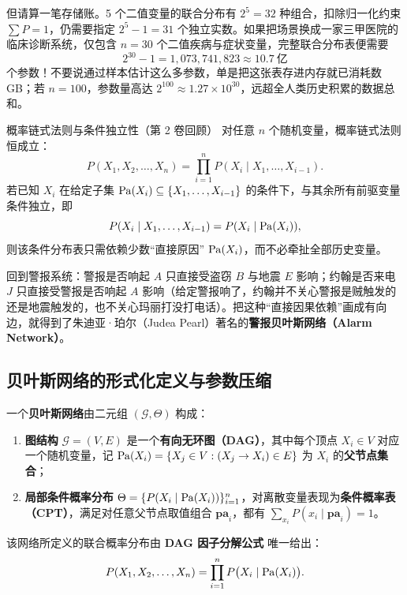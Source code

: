 但请算一笔存储账。5 个二值变量的联合分布有 $2^5 = 32$ 种组合，扣除归一化约束 $\sum P = 1$，仍需要指定 $2^5 - 1 = 31$ 个独立实数。如果把场景换成一家三甲医院的临床诊断系统，仅包含 $n = 30$ 个二值疾病与症状变量，完整联合分布表便需要
\[
  2^{30} - 1 = 1{,}073{,}741{,}823 \approx 10.7\ \text{亿}
\]
个参数！不要说通过样本估计这么多参数，单是把这张表存进内存就已消耗数 GB；若 $n = 100$，参数量高达 $2^{100} \approx 1.27 \times 10^{30}$，远超全人类历史积累的数据总和。

\begin{recallBox}{概率链式法则与条件独立性（第 2 卷回顾）}
对任意 $n$ 个随机变量，概率链式法则恒成立：
\[
  P(X_1, X_2, \dots, X_n) = \prod_{i=1}^{n} P(X_i \mid X_1, \dots, X_{i-1}).
\]
若已知 $X_i$ 在给定子集 $\operatorname{Pa}(X_i) \subseteq \{X_1,\dots,X_{i-1}\}$ 的条件下，与其余所有前驱变量条件独立，即
\[
  P(X_i \mid X_1, \dots, X_{i-1}) = P(X_i \mid \operatorname{Pa}(X_i)),
\]
则该条件分布表只需依赖少数“直接原因” $\operatorname{Pa}(X_i)$，而不必牵扯全部历史变量。
\end{recallBox}

回到警报系统：警报是否响起 $A$ 只直接受盗窃 $B$ 与地震 $E$ 影响；约翰是否来电 $J$ 只直接受警报是否响起 $A$ 影响（给定警报响了，约翰并不关心警报是贼触发的还是地震触发的，也不关心玛丽打没打电话）。把这种“直接因果依赖”画成有向边，就得到了朱迪亚·珀尔（Judea Pearl）著名的\textbf{警报贝叶斯网络（Alarm Network）}。

\subsection{贝叶斯网络的形式化定义与参数压缩}

\begin{defBox}
\begin{definition}\label{def:bn}
一个\textbf{贝叶斯网络}由二元组 $(\mathcal{G}, \Theta)$ 构成：
\begin{enumerate}
  \item \textbf{图结构} $\mathcal{G} = (V, E)$ 是一个\textbf{有向无环图（DAG）}，其中每个顶点 $X_i \in V$ 对应一个随机变量，记 $\operatorname{Pa}(X_i) = \{X_j \in V : (X_j \to X_i) \in E\}$ 为 $X_i$ 的\textbf{父节点集合}；
  \item \textbf{局部条件概率分布} $\Theta = \{P(X_i \mid \operatorname{Pa}(X_i))\}_{i=1}^n$，对离散变量表现为\textbf{条件概率表（CPT）}，满足对任意父节点取值组合 $\mathbf{pa}_i$，都有 $\sum_{x_i} P(x_i \mid \mathbf{pa}_i) = 1$。
\end{enumerate}
该网络所定义的联合概率分布由 \textbf{DAG 因子分解公式} 唯一给出：
\begin{equation}\label{eq:bn-factorization}
  P(X_1, X_2, \dots, X_n) = \prod_{i=1}^{n} P\big(X_i \mid \operatorname{Pa}(X_i)\big).
\end{equation}
\end{definition}
\end{defBox}

